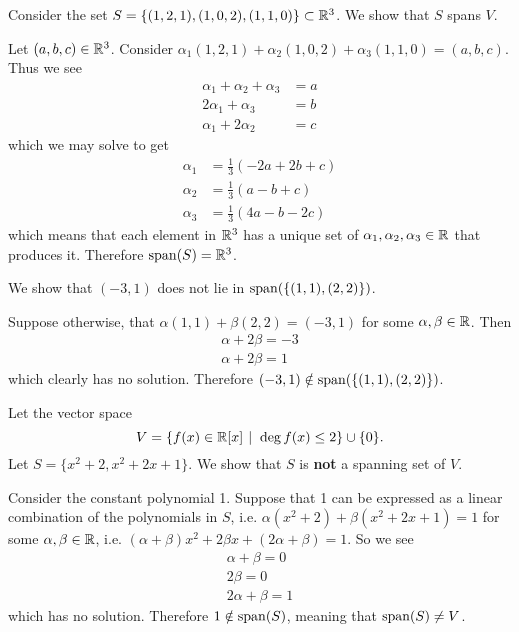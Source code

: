 \begin{example}
    Consider the set $S = \{(1, 2, 1), (1, 0, 2), (1, 1, 0)\} \subset \mathbb{R}^3$. We show that $S$ spans $V$.

    Let $(a, b, c) \in \mathbb{R}^3$. Consider $\alpha_1(1, 2, 1) + \alpha_2(1, 0, 2) + \alpha_3(1, 1, 0) = (a, b, c)$. Thus we see
    \begin{align*}
        \alpha_1 + \alpha_2 + \alpha_3 &= a\\
        2\alpha_1 + \alpha_3 &= b\\
        \alpha_1 + 2\alpha_2 &= c
    \end{align*}
    which we may solve to get
    \begin{align*}
        \alpha_1 &= \frac13(-2a + 2b + c)\\
        \alpha_2 &= \frac13(a - b + c)\\
        \alpha_3 &= \frac13(4a - b - 2c)
    \end{align*}
    which means that each element in $\mathbb{R}^3$ has a unique set of $\alpha_1, \alpha_2, \alpha_3 \in \mathbb{R}$ that produces it. Therefore $\mathrm{span}(S) = \mathbb{R}^3$.
\end{example}

\begin{example}
    We show that $(-3, 1)$ does not lie in $\mathrm{span}(\{(1,1), (2,2)\})$.

    Suppose otherwise, that $\alpha(1,1) + \beta(2,2) = (-3,1)$ for some $\alpha, \beta \in \mathbb{R}$. Then
    \begin{align*}
        \alpha + 2\beta = -3\\
        \alpha + 2\beta = 1
    \end{align*}
    which clearly has no solution. Therefore $(-3, 1) \notin \mathrm{span}(\{(1, 1), (2, 2)\})$.
\end{example}

\begin{example}
    Let the vector space
    \[
        V = \{f(x) \in \R[x] \vert \deg f(x) \leq 2\} \cup \{0\}.
    \]
    Let $S = \{x^2 + 2, x^2 + 2x + 1\}$. We show that $S$ is \textbf{not} a spanning set of $V$.

    Consider the constant polynomial 1. Suppose that 1 can be expressed as a linear combination of the polynomials in $S$, i.e. $\alpha(x^2 + 2) + \beta(x^2+2x+1) = 1$ for some $\alpha, \beta \in \mathbb{R}$, i.e. $(\alpha + \beta)x^2 + 2\beta x + (2\alpha + \beta) = 1$. So we see
    \begin{align*}
        \alpha + \beta = 0\\
        2\beta = 0\\
        2\alpha + \beta = 1
    \end{align*}
    which has no solution. Therefore $1 \notin \mathrm{span}(S)$, meaning that $\mathrm{span}(S) \neq V$.
\end{example}

